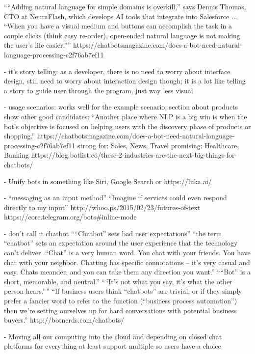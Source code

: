   ``“Adding natural language for simple domains is overkill,” says Dennis Thomas, CTO at NeuraFlash, which develops AI tools that integrate into Salesforce ... “When you have a visual medium and buttons can accomplish the task in a couple clicks (think easy re-order), open-ended natural language is not making the user’s life easier.”''
  https://chatbotsmagazine.com/does-a-bot-need-natural-language-processing-c2f76ab7ef11


- it's story telling:
  as a developer, there is no need to worry about interface design,
  still need to worry about interaction design though;
  it is a lot like telling a story to guide user through the program,
  just way less visual



- usage scenarios:
  works well for the example scenario,
  section about products show other good candidates:
  ``Another place where NLP is a big win is when the bot’s objective is focused on helping users with the discovery phase of products or shopping.''
  https://chatbotsmagazine.com/does-a-bot-need-natural-language-processing-c2f76ab7ef11
  strong for: Sales, News, Travel
  promising: Healthcare, Banking
  https://blog.botlist.co/these-2-industries-are-the-next-big-things-for-chatbots/

- Unify bots in something like Siri, Google Search or https://luka.ai/

- ``messaging as an input method''
  ``Imagine if services could even respond directly to my input''
  http://whoo.ps/2015/02/23/futures-of-text
  https://core.telegram.org/bots#inline-mode

- don't call it chatbot
  ``“Chatbot” sets bad user expectations''
  ``the term “chatbot” sets an expectation around the user experience that the technology can’t deliver.  “Chat” is a very human word. You chat with your friends. You have chat with your neighbor. Chatting has specific connotations – it’s very casual and easy. Chats meander, and you can take them any direction you want.''
  ``“Bot” is a short, memorable, and neutral.''
  ``“It’s not what you say, it’s what the other person hears.”''
  ``If business users think “chatbots” are trivial, or if they simply prefer a fancier word to refer to the function (“business process automation”) then we’re setting ourselves up for hard conversations with potential business buyers.''
  http://botnerds.com/chatbots/



- Moving all our computing into the cloud and depending on closed chat platforms for everything
    at least support multiple so users have a choice

